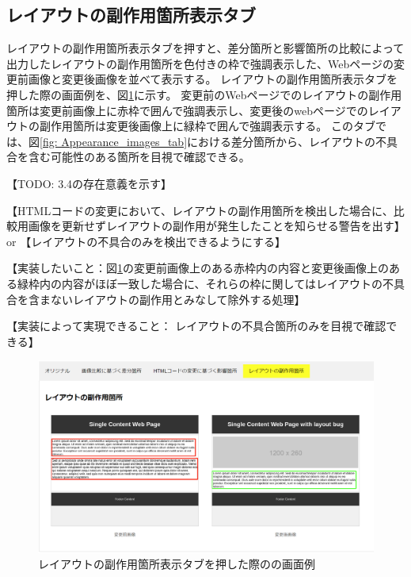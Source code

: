 \subsection{レイアウトの副作用箇所表示タブ}\label{subsec:subeffect_tab}
レイアウトの副作用箇所表示タブを押すと、差分箇所と影響箇所の比較によって出力したレイアウトの副作用箇所を色付きの枠で強調表示した、Webページの変更前画像と変更後画像を並べて表示する。
レイアウトの副作用箇所表示タブを押した際の画面例を、図\ref{fig: Appearance_subEffect_tab}に示す。
変更前のWebページでのレイアウトの副作用箇所は変更前画像上に赤枠で囲んで強調表示し、変更後のwebページでのレイアウトの副作用箇所は変更後画像上に緑枠で囲んで強調表示する。
このタブでは、図\ref{fig: Appearance_images_tab}における差分箇所から、レイアウトの不具合を含む可能性のある箇所を目視で確認できる。
\par
【TODO: 3.4の存在意義を示す】
\par
【HTMLコードの変更において、レイアウトの副作用箇所を検出した場合に、比較用画像を更新せずレイアウトの副作用が発生したことを知らせる警告を出す】
or
【レイアウトの不具合のみを検出できるようにする】
\par
【実装したいこと：図\ref{fig: Appearance_subEffect_tab}の変更前画像上のある赤枠内の内容と変更後画像上のある緑枠内の内容がほぼ一致した場合に、それらの枠に関してはレイアウトの不具合を含まないレイアウトの副作用とみなして除外する処理】
\par
【実装によって実現できること： レイアウトの不具合箇所のみを目視で確認できる】
\begin{figure}[tp]
    \begin{center}
        \includegraphics[width=1.0\columnwidth]{image/3_subEffect_tab.png}
        \caption{レイアウトの副作用箇所表示タブを押した際の\toolName の画面例}
        \label{fig: Appearance_subEffect_tab}
    \end{center}
\end{figure}

